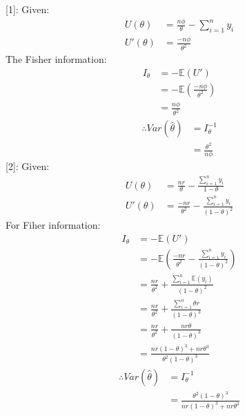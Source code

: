 \documentclass[a4paper]{article}
\begin{document}
	\subsection{}
		[1]:\newline
			Given:
				\begin{equation}
					\begin{split}
						U(\theta) &= \frac{n\phi}{\theta}-\sum_{i=1}^n y_i\\
						U'(\theta) &= \frac{-n\phi}{\theta^2}
					\end{split}
				\end{equation}
			The Fisher information:
				\begin{equation*}
					\begin{split}
					I_\theta &= -\mathbb{E}(U')\\
					&= -\mathbb{E}\left(\frac{-n\phi}{\theta^2}\right)\\
					&= \frac{n\phi}{\theta^2}
					\end{split}
				\end{equation*}
			\begin{equation*}
				\begin{split}
					\therefore Var(\hat{\theta}) &= I_\theta^{-1}\\
					&= \frac{\theta^2}{n\phi}
				\end{split}
			\end{equation*}
		[2]:\newline
			Given:
				\begin{equation*}
					\begin{split}
						U(\theta) &= \frac{nr}{\theta} - \frac{\sum_{i=1}^n y_i}{1-\theta}\\
						U'(\theta) &= \frac{-nr}{\theta^2} - \frac{\sum_{i=1}^n y_i}{(1-\theta)^2}
					\end{split}
				\end{equation*}
			For Fiher information:
				\begin{equation*}
					\begin{split}
						I_\theta &= -\mathbb{E}(U')\\
						&= -\mathbb{E}\left(\frac{-nr}{\theta^2} - \frac{\sum_{i=1}^n y_i}{(1-\theta)^2}\right)\\
						&= \frac{nr}{\theta^2} + \frac{\sum_{i=1}^n \mathbb{E}(y_i)}{(1-\theta)^2}\\
						&= \frac{nr}{\theta^2} + \frac{\sum_{i=1}^n \theta r}{(1-\theta)^3}\\
						&= \frac{nr}{\theta^2} + \frac{nr\theta}{(1-\theta)^3}\\
						&= \frac{nr(1-\theta)^3+nr\theta^3}{\theta^2(1-\theta)^3}
					\end{split}
				\end{equation*}
			\begin{equation*}
				\begin{split}
					\therefore Var(\hat{\theta}) &= I_\theta^{-1}\\
					&= \frac{\theta^2(1-\theta)^3}{nr(1-\theta)^3+nr\theta^3}
				\end{split}
			\end{equation*}
\end{document}
